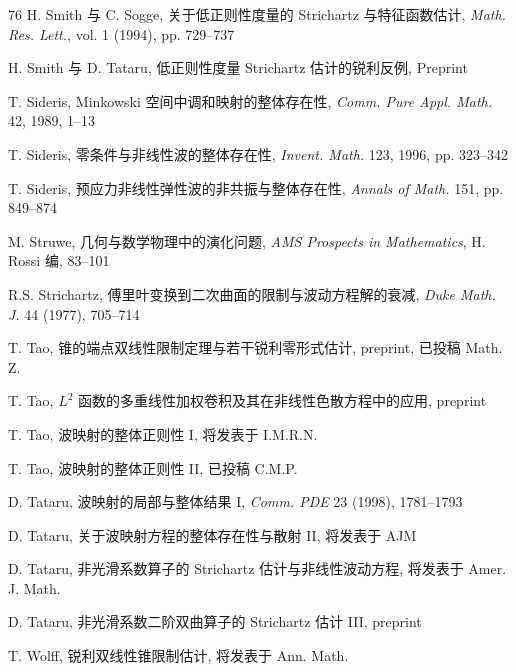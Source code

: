 \begin{mybibliography}{76}
 H. Smith 与 C. Sogge,  关于低正则性度量的 Strichartz 与特征函数估计,  \emph{Math. Res. Lett.},  vol. 1 (1994),  pp. 729--737

 H. Smith 与 D. Tataru,  低正则性度量 Strichartz 估计的锐利反例,  Preprint

 T. Sideris,  Minkowski 空间中调和映射的整体存在性,  \emph{Comm. Pure Appl. Math.} 42,  1989,  1--13

 T. Sideris,  零条件与非线性波的整体存在性,  \emph{Invent. Math.} 123,  1996,  pp. 323--342

 T. Sideris,  预应力非线性弹性波的非共振与整体存在性,  \emph{Annals of Math.} 151,  pp. 849--874

 M. Struwe,  几何与数学物理中的演化问题,  \emph{AMS Prospects in Mathematics},  H. Rossi 编,  83--101

 R.S. Strichartz,  傅里叶变换到二次曲面的限制与波动方程解的衰减,  \emph{Duke Math. J.} 44 (1977),  705--714

 T. Tao,  锥的端点双线性限制定理与若干锐利零形式估计,  preprint,  已投稿 Math. Z.

 T. Tao,  $L^2$ 函数的多重线性加权卷积及其在非线性色散方程中的应用,  preprint

 T. Tao,  波映射的整体正则性 I,  将发表于 I.M.R.N.

 T. Tao,  波映射的整体正则性 II,  已投稿 C.M.P.

 D. Tataru,  波映射的局部与整体结果 I,  \emph{Comm. PDE} 23 (1998),  1781--1793

 D. Tataru,  关于波映射方程的整体存在性与散射 II,  将发表于 AJM

 D. Tataru,  非光滑系数算子的 Strichartz 估计与非线性波动方程,  将发表于 Amer. J. Math.

 D. Tataru,  非光滑系数二阶双曲算子的 Strichartz 估计 III,  preprint

 T. Wolff,  锐利双线性锥限制估计,  将发表于 Ann. Math.

\end{mybibliography}

